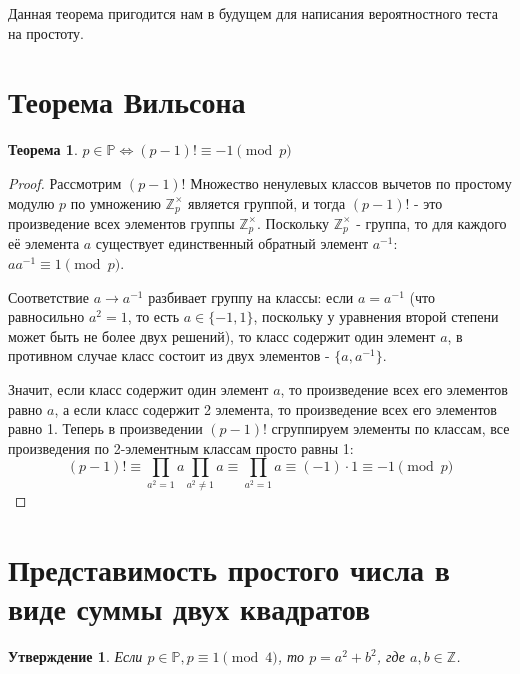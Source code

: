 \documentclass[12pt, a4paper, openany]{book}
\newtheorem*{theorem}{Теорема}
\newtheorem*{statement}{Утверждение}
\begin{document}
    Данная теорема пригодится нам в будущем для написания вероятностного теста на простоту.

\newpage
\section{Теорема Вильсона}

\begin{theorem}
    $p \in \mathbb{P} \Leftrightarrow (p - 1)! \equiv -1 \pmod{p}$
\end{theorem}

\begin{proof}
    Рассмотрим $(p - 1)!$ Множество ненулевых классов вычетов по простому модулю $p$ по умножению $\mathbb{Z}_p^\times$ является группой, и тогда $(p - 1)!$ - это произведение всех элементов группы $\mathbb{Z}_p^\times$. Поскольку $\mathbb{Z}_p^\times$ - группа, то для каждого её элемента $a$ существует единственный обратный элемент $a^{-1}$: $aa^{-1} \equiv 1 \pmod{p}$.  
    
    Соответствие $a \to a^{-1}$ разбивает группу на классы: если $a = a^{-1}$ (что равносильно $a^2 = 1$, то есть $a \in \{-1, 1\}$, поскольку у уравнения второй степени может быть не более двух решений), то класс содержит один элемент $a$, в противном случае класс состоит из двух элементов - $\{a, a^{-1}\}$. 
    
    Значит, если класс содержит один элемент $a$, то произведение всех его элементов равно $a$, а если класс содержит 2 элемента, то произведение всех его элементов равно 1. Теперь в произведении $(p - 1)!$ сгруппируем элементы по классам, все произведения по 2-элементным классам просто равны 1:
    \[
    (p - 1)! \equiv \prod_{a^2 = 1}a \prod_{a^2 \neq 1}a \equiv \prod_{a^2 = 1}a \equiv (-1) \cdot 1 \equiv -1 \pmod{p}
    \]
\end{proof}

\section{Представимость простого числа в виде суммы двух квадратов}

\begin{statement}
    Если $p \in \mathbb{P}, p \equiv 1 \pmod{4}$, то $p = a^2 + b^2$, где $a, b \in \mathbb{Z}$.
\end{statement}
\end{document}
